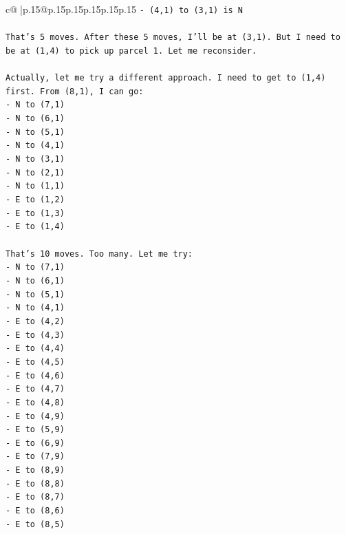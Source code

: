 \documentclass{article}
\begin{document}
{\begin{supertabular}{c@{$\;$}|p{.15\linewidth}@{}p{.15\linewidth}p{.15\linewidth}p{.15\linewidth}p{.15\linewidth}p{.15\linewidth}}
{{{\texttt{{-} (4,1) to (3,1) is N} \\
\\ 
\texttt{That's 5 moves. After these 5 moves, I'll be at (3,1). But I need to be at (1,4) to pick up parcel 1. Let me reconsider.} \\
\\ 
\texttt{Actually, let me try a different approach. I need to get to (1,4) first. From (8,1), I can go:} \\
\texttt{{-} N to (7,1)} \\
\texttt{{-} N to (6,1)} \\
\texttt{{-} N to (5,1)} \\
\texttt{{-} N to (4,1)} \\
\texttt{{-} N to (3,1)} \\
\texttt{{-} N to (2,1)} \\
\texttt{{-} N to (1,1)} \\
\texttt{{-} E to (1,2)} \\
\texttt{{-} E to (1,3)} \\
\texttt{{-} E to (1,4)} \\
\\ 
\texttt{That's 10 moves. Too many. Let me try:} \\
\texttt{{-} N to (7,1)} \\
\texttt{{-} N to (6,1)} \\
\texttt{{-} N to (5,1)} \\
\texttt{{-} N to (4,1)} \\
\texttt{{-} E to (4,2)} \\
\texttt{{-} E to (4,3)} \\
\texttt{{-} E to (4,4)} \\
\texttt{{-} E to (4,5)} \\
\texttt{{-} E to (4,6)} \\
\texttt{{-} E to (4,7)} \\
\texttt{{-} E to (4,8)} \\
\texttt{{-} E to (4,9)} \\
\texttt{{-} E to (5,9)} \\
\texttt{{-} E to (6,9)} \\
\texttt{{-} E to (7,9)} \\
\texttt{{-} E to (8,9)} \\
\texttt{{-} E to (8,8)} \\
\texttt{{-} E to (8,7)} \\
\texttt{{-} E to (8,6)} \\
\texttt{{-} E to (8,5)} \\
}}}
\end{supertabular}}
\end{document}
